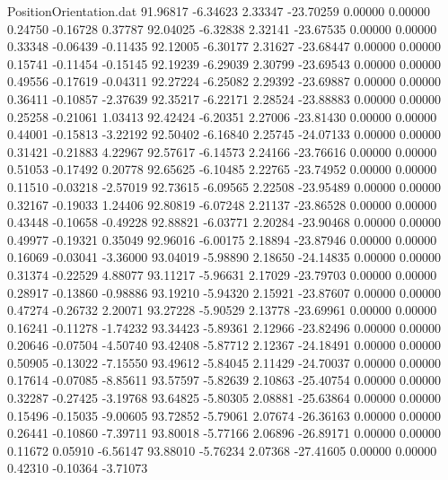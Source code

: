 \begin{filecontents}{PositionOrientation.dat}
  91.96817   -6.34623    2.33347   -23.70259    0.00000    0.00000    0.24750   -0.16728    0.37787
  92.04025   -6.32838    2.32141   -23.67535    0.00000    0.00000    0.33348   -0.06439   -0.11435
  92.12005   -6.30177    2.31627   -23.68447    0.00000    0.00000    0.15741   -0.11454   -0.15145
  92.19239   -6.29039    2.30799   -23.69543    0.00000    0.00000    0.49556   -0.17619   -0.04311
  92.27224   -6.25082    2.29392   -23.69887    0.00000    0.00000    0.36411   -0.10857   -2.37639
  92.35217   -6.22171    2.28524   -23.88883    0.00000    0.00000    0.25258   -0.21061    1.03413
  92.42424   -6.20351    2.27006   -23.81430    0.00000    0.00000    0.44001   -0.15813   -3.22192
  92.50402   -6.16840    2.25745   -24.07133    0.00000    0.00000    0.31421   -0.21883    4.22967
  92.57617   -6.14573    2.24166   -23.76616    0.00000    0.00000    0.51053   -0.17492    0.20778
  92.65625   -6.10485    2.22765   -23.74952    0.00000    0.00000    0.11510   -0.03218   -2.57019
  92.73615   -6.09565    2.22508   -23.95489    0.00000    0.00000    0.32167   -0.19033    1.24406
  92.80819   -6.07248    2.21137   -23.86528    0.00000    0.00000    0.43448   -0.10658   -0.49228
  92.88821   -6.03771    2.20284   -23.90468    0.00000    0.00000    0.49977   -0.19321    0.35049
  92.96016   -6.00175    2.18894   -23.87946    0.00000    0.00000    0.16069   -0.03041   -3.36000
  93.04019   -5.98890    2.18650   -24.14835    0.00000    0.00000    0.31374   -0.22529    4.88077
  93.11217   -5.96631    2.17029   -23.79703    0.00000    0.00000    0.28917   -0.13860   -0.98886
  93.19210   -5.94320    2.15921   -23.87607    0.00000    0.00000    0.47274   -0.26732    2.20071
  93.27228   -5.90529    2.13778   -23.69961    0.00000    0.00000    0.16241   -0.11278   -1.74232
  93.34423   -5.89361    2.12966   -23.82496    0.00000    0.00000    0.20646   -0.07504   -4.50740
  93.42408   -5.87712    2.12367   -24.18491    0.00000    0.00000    0.50905   -0.13022   -7.15550
  93.49612   -5.84045    2.11429   -24.70037    0.00000    0.00000    0.17614   -0.07085   -8.85611
  93.57597   -5.82639    2.10863   -25.40754    0.00000    0.00000    0.32287   -0.27425   -3.19768
  93.64825   -5.80305    2.08881   -25.63864    0.00000    0.00000    0.15496   -0.15035   -9.00605
  93.72852   -5.79061    2.07674   -26.36163    0.00000    0.00000    0.26441   -0.10860   -7.39711
  93.80018   -5.77166    2.06896   -26.89171    0.00000    0.00000    0.11672    0.05910   -6.56147
  93.88010   -5.76234    2.07368   -27.41605    0.00000    0.00000    0.42310   -0.10364   -3.71073

\end{filecontents}
